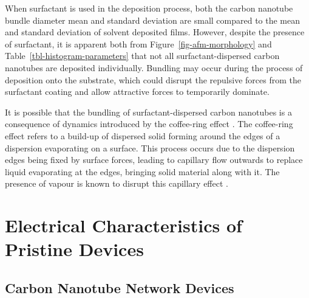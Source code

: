 \documentclass[
  a4paper,
]{scrbook}
\begin{document}
When surfactant is used in the deposition process, both the carbon
nanotube bundle diameter mean and standard deviation are small compared
to the mean and standard deviation of solvent deposited films. However,
despite the presence of surfactant, it is apparent both from
Figure~\ref{fig-afm-morphology} and Table~\ref{tbl-histogram-parameters}
that not all surfactant-dispersed carbon nanotubes are deposited
individually. Bundling may occur during the process of deposition onto
the substrate, which could disrupt the repulsive forces from the
surfactant coating and allow attractive forces to temporarily dominate.

It is possible that the bundling of surfactant-dispersed carbon
nanotubes is a consequence of dynamics introduced by the coffee-ring
effect \autocite{Deegan1997,VanGaalen2021}. The coffee-ring effect
refers to a build-up of dispersed solid forming around the edges of a
dispersion evaporating on a surface. This process occurs due to the
dispersion edges being fixed by surface forces, leading to capillary
flow outwards to replace liquid evaporating at the edges, bringing solid
material along with it. The presence of vapour is known to disrupt this
capillary effect \autocite{Bishop2020}.

\hypertarget{sec-pristine-electrical-characterisation}{%
\section{Electrical Characteristics of Pristine
Devices}\label{sec-pristine-electrical-characterisation}}

\hypertarget{carbon-nanotube-network-devices}{%
\subsection{Carbon Nanotube Network
Devices}\label{carbon-nanotube-network-devices}}
\end{document}
